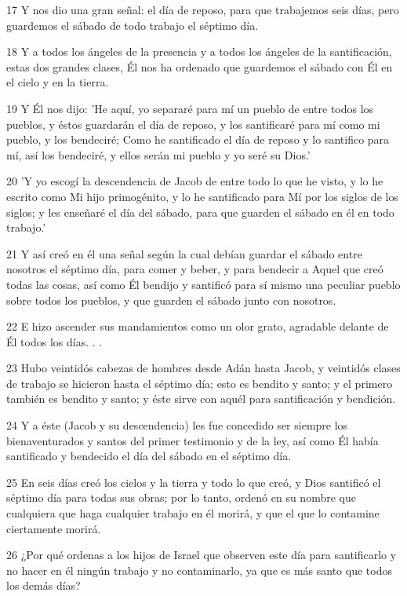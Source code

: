 \par 17 Y nos dio una gran señal: el día de reposo, para que trabajemos seis días, pero guardemos el sábado de todo trabajo el séptimo día.
\par 18 Y a todos los ángeles de la presencia y a todos los ángeles de la santificación, estas dos grandes clases, Él nos ha ordenado que guardemos el sábado con Él en el cielo y en la tierra.
\par 19 Y Él nos dijo: 'He aquí, yo separaré para mí un pueblo de entre todos los pueblos, y éstos guardarán el día de reposo, y los santificaré para mí como mi pueblo, y los bendeciré; Como he santificado el día de reposo y lo santifico para mí, así los bendeciré, y ellos serán mi pueblo y yo seré su Dios.'
\par 20 'Y yo escogí la descendencia de Jacob de entre todo lo que he visto, y lo he escrito como Mi hijo primogénito, y lo he santificado para Mí por los siglos de los siglos; y les enseñaré el día del sábado, para que guarden el sábado en él en todo trabajo.'
\par 21 Y así creó en él una señal según la cual debían guardar el sábado entre nosotros el séptimo día, para comer y beber, y para bendecir a Aquel que creó todas las cosas, así como Él bendijo y santificó para sí mismo una peculiar pueblo sobre todos los pueblos, y que guarden el sábado junto con nosotros.
\par 22 E hizo ascender sus mandamientos como un olor grato, agradable delante de Él todos los días. . .
\par 23 Hubo veintidós cabezas de hombres desde Adán hasta Jacob, y veintidós clases de trabajo se hicieron hasta el séptimo día; esto es bendito y santo; y el primero también es bendito y santo; y éste sirve con aquél para santificación y bendición.
\par 24 Y a éste (Jacob y su descendencia) les fue concedido ser siempre los bienaventurados y santos del primer testimonio y de la ley, así como Él había santificado y bendecido el día del sábado en el séptimo día.
\par 25 En seis días creó los cielos y la tierra y todo lo que creó, y Dios santificó el séptimo día para todas sus obras; por lo tanto, ordenó en su nombre que cualquiera que haga cualquier trabajo en él morirá, y que el que lo contamine ciertamente morirá.
\par 26 ¿Por qué ordenas a los hijos de Israel que observen este día para santificarlo y no hacer en él ningún trabajo y no contaminarlo, ya que es más santo que todos los demás días?
